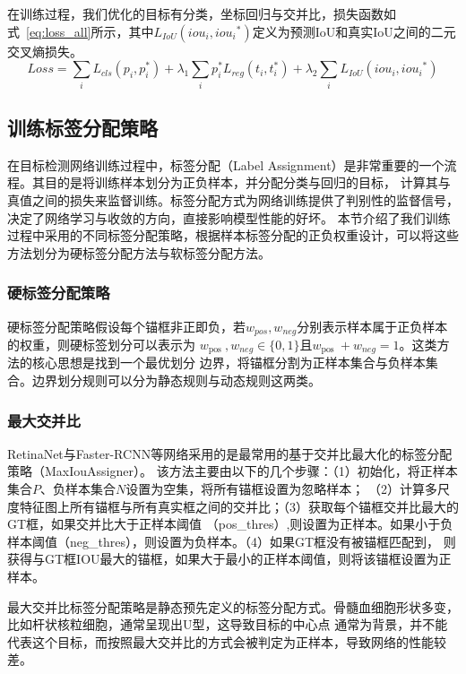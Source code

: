 在训练过程，我们优化的目标有分类，坐标回归与交并比，损失函数如式~\ref{eq:loss_all}所示，其中${{L_{IoU}}(io{u_i},io{u_i}^*)}$定义为预测IoU和真实IoU之间的二元交叉熵损失。
\begin{equation}   
  Loss = \sum\limits_i {{L_{cls}}} \left( {{p_i},p_i^*} \right) + {\lambda _1}\sum\limits_i {p_i^*} {L_{reg}}\left( {{t_i},t_i^*} \right) + {\lambda _2}\sum\limits_i {{L_{IoU}}(io{u_i},io{u_i}^*)} 
  \label{eq:loss_all} 
\end{equation}

\subsection{训练标签分配策略}
  在目标检测网络训练过程中，标签分配（Label Assignment）是非常重要的一个流程。其目的是将训练样本划分为正负样本，并分配分类与回归的目标，
  计算其与真值之间的损失来监督训练。标签分配方式为网络训练提供了判别性的监督信号，决定了网络学习与收敛的方向，直接影响模型性能的好坏。
  本节介绍了我们训练过程中采用的不同标签分配策略，根据样本标签分配的正负权重设计，可以将这些方法划分为硬标签分配方法与软标签分配方法。

\subsubsection{硬标签分配策略}
硬标签分配策略假设每个锚框非正即负，若$w_{pos}, w_{neg}$分别表示样本属于正负样本的权重，则硬标签划分可以表示为
$w_{\text {pos }}, w_{n e g} \in\{0,1\}$且$w_{\text {pos }} +  w_{n e g} = 1$。这类方法的核心思想是找到一个最优划分
边界，将锚框分割为正样本集合与负样本集合。边界划分规则可以分为静态规则与动态规则这两类。

\subsubsection{最大交并比}
RetinaNet与Faster-RCNN等网络采用的是最常用的基于交并比最大化的标签分配策略（MaxIouAssigner）。
该方法主要由以下的几个步骤：（1）初始化，将正样本集合$P$、负样本集合$N$设置为空集，将所有锚框设置为忽略样本；
（2）计算多尺度特征图上所有锚框与所有真实框之间的交并比；（3）获取每个锚框交并比最大的GT框，如果交并比大于正样本阈值
（pos\_thres）,则设置为正样本。如果小于负样本阈值（neg\_thres），则设置为负样本。（4）如果GT框没有被锚框匹配到，
则获得与GT框IOU最大的锚框，如果大于最小的正样本阈值，则将该锚框设置为正样本。

最大交并比标签分配策略是静态预先定义的标签分配方式。骨髓血细胞形状多变，比如杆状核粒细胞，通常呈现出U型，这导致目标的中心点
通常为背景，并不能代表这个目标，而按照最大交并比的方式会被判定为正样本，导致网络的性能较差。
